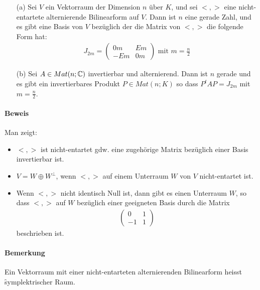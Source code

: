 \begin{satz} %
\label{satz581}
\begin{itemize}
\item[(a)] Sei $V$ ein Vektorraum der Dimension $n$ über $K$, und sei $<, >$ eine nicht-entartete alternierende Bilinearform auf $V$. Dann ist $n$ eine gerade Zahl, und es gibt eine Basis von $V$ bezüglich der die Matrix von $<, >$ die folgende Form hat:
\begin{align}
J_{2m} = \begin{pmatrix}0m & Em \\ -Em & 0m\end{pmatrix} \text{ mit } m = \frac{n}{2}
\end{align}

\item[(b)] Sei $A \in Mat(n; \mathbb{C})$ invertierbar und alternierend. Dann ist $n$ gerade und es gibt ein invertierbares Produkt $P \in Mat(n; K)$ so dass $P^{t} A P = J_{2m}$ mit $m = \frac{n}{2}$.
\end{itemize}
\end{satz}

\paragraph{Beweis}
Man zeigt:
\begin{itemize}
\item $<, >$ ist nicht-entartet gdw. eine zugehörige Matrix bezüglich einer Basis invertierbar ist.
\item $V = W \oplus W^{\perp}$, wenn $<, >$ auf einem Unterraum $W$ von $V$ nicht-entartet ist.
\item Wenn $<, >$ nicht identisch Null ist, dann gibt es einen Unterraum $W$, so dass $<, >$ auf $W$ bezüglich einer geeigneten Basis durch die Matrix
\begin{align}
\begin{pmatrix} 0 & 1 \\ -1 & 1\end{pmatrix}
\end{align}
beschrieben ist.
\end{itemize}

\paragraph{Bemerkung}
Ein Vektorraum mit einer nicht-entarteten alternierenden Bilinearform heisst \f{symplektrischer} Raum.

\printindex



